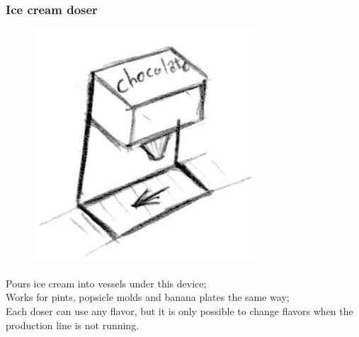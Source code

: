 \documentclass[a4paper]{scrartcl}
\begin{document}
        \subsubsection{Ice cream doser}
            \begin{minipage}[t][6em][t]{\textwidth}
                \begin{figure}
                    \vspace{-20pt}
                    \includegraphics[scale=1]{devices/ice_cream_doser}
                    \vspace{-20pt}
                \end{figure}

                Pours ice cream into vessels under this device;\\
                Works for pints, popsicle molds and banana plates the same way;\\
                Each doser can use any flavor, but it is only possible to change
                flavors when the production line is not running.
            \end{minipage}
\end{document}
